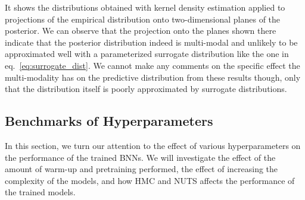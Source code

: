\noindent It shows the distributions obtained with kernel density estimation applied to projections of the empirical distribution onto two-dimensional planes of the posterior.
We can observe that the projection onto the planes shown there indicate that the posterior distribution indeed is multi-modal
and unlikely to be approximated well with a parameterized surrogate distribution like the one in eq.~\eqref{eq:surrogate_dist}. We cannot make any comments on the specific effect the multi-modality has on the predictive distribution from these results though, only that the distribution itself is poorly approximated by surrogate distributions.





\subsection{Benchmarks of Hyperparameters}\label{subsec:benchmarks}
In this section, we turn our attention to the effect of various hyperparameters on the performance of the trained BNNs. 
We will investigate the effect of the amount of warm-up and pretraining performed, the effect of increasing the complexity of the models, and how HMC and NUTS affects the performance of the trained models. 


